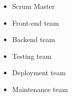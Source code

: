 \label{sec:team-organization}
\begin{itemize}
\item Scrum Master
\item Front-end team
\item Backend team
\item Testing team
\item Deployment team
\item Maintenance team
\end{itemize}